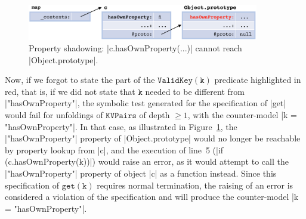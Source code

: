 \begin{figure}[t!]
\centering
\includegraphics[width=0.9\textwidth]{figures/heapfail.png}
\caption{Property shadowing: \jsinline|c.hasOwnProperty(...)| cannot reach \jsinline|Object.prototype|.} 
\label{fig:cexget}
\vspace{-0.5cm}
\end{figure}

Now, if we forgot to state the part of the $\mathtt{ValidKey(k)}$ predicate highlighted in red, that is, if we did not state that $\mathtt{k}$ needed to be different from \jsinline|"hasOwnProperty"|, the symbolic test generated for the specification of \jsinline|get| would fail for unfoldings of $\mathtt{KVPairs}$ of depth $\geq 1$, with the counter-model \jsinline|k = "hasOwnProperty"|. 
In that case, as illustrated in Figure~\ref{fig:cexget}, the \jsinline|"hasOwnProperty"| property of \jsinline|Object.prototype| would no longer be reachable by property lookup from \jsinline|c|, and
the execution of line~5 (\jsinline|if (c.hasOwnProperty(k))|) would raise an error, as it would attempt to call the \jsinline|"hasOwnProperty"| property of object \jsinline|c| as a function instead. 
Since this specification of $\mathtt{get(k)}$ requires normal termination, the raising of an error is considered a violation of the specification and 
\jilette will produce the counter-model \jsinline|k = "hasOwnProperty"|.



